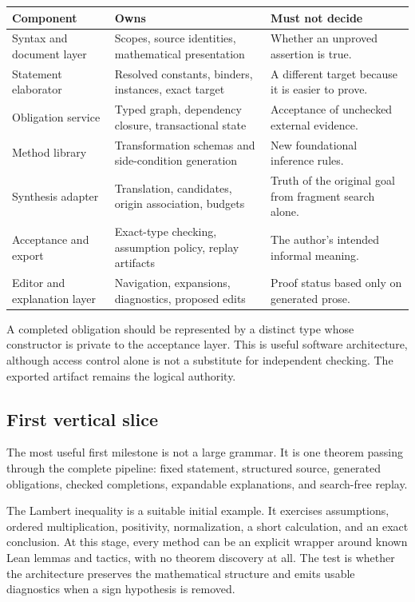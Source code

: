 \documentclass[11pt,a4paper]{article}
\begin{document}
\begin{center}
\small
\begin{tabularx}{\textwidth}{@{}>{\raggedright\arraybackslash}p{}YY@{}}
\toprule
Component & Owns & Must not decide \\
\midrule
Syntax and document layer & Scopes, source identities, mathematical presentation & Whether an unproved assertion is true. \\
Statement elaborator & Resolved constants, binders, instances, exact target & A different target because it is easier to prove. \\
Obligation service & Typed graph, dependency closure, transactional state & Acceptance of unchecked external evidence. \\
Method library & Transformation schemas and side-condition generation & New foundational inference rules. \\
Synthesis adapter & Translation, candidates, origin association, budgets & Truth of the original goal from fragment search alone. \\
Acceptance and export & Exact-type checking, assumption policy, replay artifacts & The author's intended informal meaning. \\
Editor and explanation layer & Navigation, expansions, diagnostics, proposed edits & Proof status based only on generated prose. \\
\bottomrule
\end{tabularx}
\end{center}

A completed obligation should be represented by a distinct type whose constructor is private to the acceptance layer. This is useful software architecture, although access control alone is not a substitute for independent checking. The exported artifact remains the logical authority.

\subsection{First vertical slice}

The most useful first milestone is not a large grammar. It is one theorem passing through the complete pipeline: fixed statement, structured source, generated obligations, checked completions, expandable explanations, and search-free replay.

The Lambert inequality is a suitable initial example. It exercises assumptions, ordered multiplication, positivity, normalization, a short calculation, and an exact conclusion. At this stage, every method can be an explicit wrapper around known Lean lemmas and tactics, with no theorem discovery at all. The test is whether the architecture preserves the mathematical structure and emits usable diagnostics when a sign hypothesis is removed.
\end{document}
